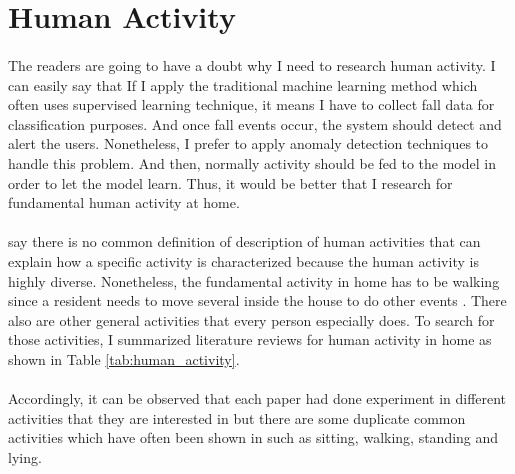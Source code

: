 \section{Human Activity}
\paragraph{}
The readers are going to have a doubt why I need to research human activity. I can easily say that If I apply the traditional machine learning method which often uses supervised learning technique, it means I have to collect fall data for classification purposes. And once fall events occur, the system should detect and alert the users. Nonetheless, I prefer to apply anomaly detection techniques to handle this problem. And then, normally activity should be fed to the model in order to let the model learn. Thus, it would be better that I research for fundamental human activity at home.

\paragraph{}
\citeauthor{schrader_2020} \citeyear{schrader_2020}  say there is no common definition of description of human activities that can explain how a specific activity is characterized because the human activity is highly diverse. Nonetheless, the fundamental activity in home has to be walking since a resident needs to move several inside the house to do other events \cite{oukrich_2019}. There also are other general activities that every person especially does. To search for those activities, I summarized  literature reviews for human activity in home as shown in Table \ref{tab:human_activity}.

\paragraph{}
Accordingly, it can be observed that each paper had done experiment in different activities that they are interested in but there are some duplicate common activities which have often been shown in such as sitting, walking, standing and lying.

